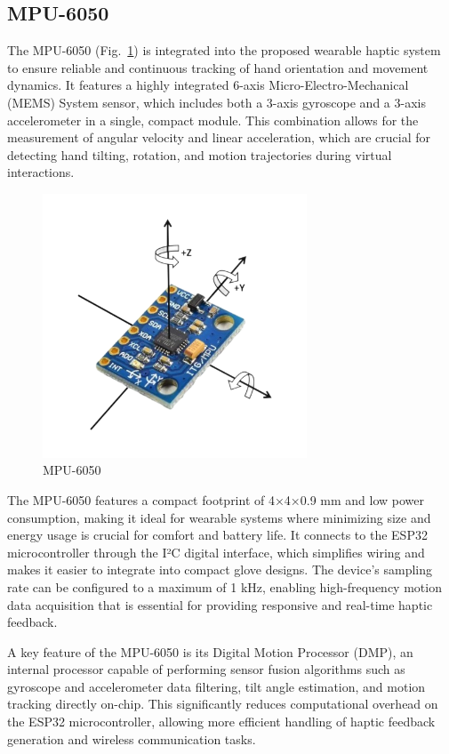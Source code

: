 \subsection{MPU-6050}
The MPU-6050 (Fig.~\ref{fig:mpu}) is integrated into the proposed wearable haptic system to ensure reliable and continuous tracking of hand orientation and movement dynamics. It features a highly integrated 6-axis Micro-Electro-Mechanical  (MEMS) System sensor, which includes both a 3-axis gyroscope and a 3-axis accelerometer in a single, compact module. This combination allows for the measurement of angular velocity and linear acceleration, which are crucial for detecting hand tilting, rotation, and motion trajectories during virtual interactions\cite{mpu}.

\begin{figure}[H]\centering
	\includegraphics[width=0.7\textwidth]{Pictures/mpu.png}%
	\caption{MPU-6050\cite{mpu}}\label{fig:mpu}%
\end{figure}

The MPU-6050 features a compact footprint of 4×4×0.9 mm and low power consumption, making it ideal for wearable systems where minimizing size and energy usage is crucial for comfort and battery life. It connects to the ESP32 microcontroller through the I²C digital interface, which simplifies wiring and makes it easier to integrate into compact glove designs. The device's sampling rate can be configured to a maximum of 1 kHz, enabling high-frequency motion data acquisition that is essential for providing responsive and real-time haptic feedback.

A key feature of the MPU-6050 is its Digital Motion Processor (DMP), an internal processor capable of performing sensor fusion algorithms such as gyroscope and accelerometer data filtering, tilt angle estimation, and motion tracking directly on-chip. This significantly reduces computational overhead on the ESP32 microcontroller, allowing more efficient handling of haptic feedback generation and wireless communication tasks\cite{mpu6050datasheet}.

